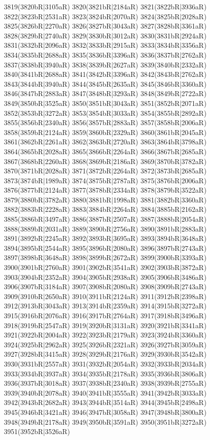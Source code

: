 3819(3820bR|3105aR) 3820(3821bR|2184aR) 3821(3822bR|3936aR) 3822(3823bR|2531aR) 3823(3824bR|2070aR) 3824(3825bR|2028aR) \\3825(3826bR|2270aR) 3826(3827bR|3043aR) 3827(3828bR|3361aR) 3828(3829bR|2740aR) 3829(3830bR|3012aR) 3830(3831bR|2924aR) 3831(3832bR|2096aR) 3832(3833bR|2915aR) 3833(3834bR|3356aR) \\3834(3835bR|2688aR) 3835(3836bR|3396aR) 3836(3837bR|2762aR) 3837(3838bR|3940aR) 3838(3839bR|2627aR) 3839(3840bR|2332aR) 3840(3841bR|2688aR) 3841(3842bR|3396aR) 3842(3843bR|2762aR) \\3843(3844bR|3940aR) 3844(3845bR|2635aR) 3845(3846bR|3360aR) 3846(3847bR|2883aR) 3847(3848bR|3293aR) 3848(3849bR|2722aR) 3849(3850bR|3525aR) 3850(3851bR|3043aR) 3851(3852bR|2071aR) \\3852(3853bR|3272aR) 3853(3854bR|3033aR) 3854(3855bR|2892aR) 3855(3856bR|2340aR) 3856(3857bR|2883aR) 3857(3858bR|2006aR) 3858(3859bR|2124aR) 3859(3860bR|2329aR) 3860(3861bR|2045aR) \\3861(3862bR|2261aR) 3862(3863bR|2720aR) 3863(3864bR|3798aR) 3864(3865bR|2028aR) 3865(3866bR|2264aR) 3866(3867bR|2685aR) 3867(3868bR|2260aR) 3868(3869bR|2186aR) 3869(3870bR|3782aR) \\3870(3871bR|2028aR) 3871(3872bR|2264aR) 3872(3873bR|2685aR) 3873(3874bR|1989aR) 3874(3875bR|2787aR) 3875(3876bR|2006aR) 3876(3877bR|2124aR) 3877(3878bR|2334aR) 3878(3879bR|3522aR) \\3879(3880bR|3782aR) 3880(3881bR|1998aR) 3881(3882bR|3360aR) 3882(3883bR|2228aR) 3883(3884bR|2264aR) 3884(3885bR|2162aR) 3885(3886bR|3497aR) 3886(3887bR|2507aR) 3887(3888bR|2054aR) \\3888(3889bR|2031aR) 3889(3890bR|2756aR) 3890(3891bR|2883aR) 3891(3892bR|2245aR) 3892(3893bR|3695aR) 3893(3894bR|3648aR) 3894(3895bR|2544aR) 3895(3896bR|2080aR) 3896(3897bR|2743aR) \\3897(3898bR|3648aR) 3898(3899bR|2672aR) 3899(3900bR|3393aR) 3900(3901bR|2760aR) 3901(3902bR|3541aR) 3902(3903bR|3872aR) 3903(3904bR|2352aR) 3904(3905bR|2938aR) 3905(3906bR|3486aR) \\3906(3907bR|3184aR) 3907(3908bR|2080aR) 3908(3909bR|2743aR) 3909(3910bR|2650aR) 3910(3911bR|2124aR) 3911(3912bR|2398aR) 3912(3913bR|3043aR) 3913(3914bR|2359aR) 3914(3915bR|3272aR) \\3915(3916bR|2076aR) 3916(3917bR|2764aR) 3917(3918bR|3496aR) 3918(3919bR|2547aR) 3919(3920bR|3131aR) 3920(3921bR|3341aR) 3921(3922bR|2004aR) 3922(3923bR|2179aR) 3923(3924bR|3360aR) \\3924(3925bR|2962aR) 3925(3926bR|2321aR) 3926(3927bR|3059aR) 3927(3928bR|3415aR) 3928(3929bR|2176aR) 3929(3930bR|3542aR) 3930(3931bR|2557aR) 3931(3932bR|2054aR) 3932(3933bR|2034aR) \\3933(3934bR|3937aR) 3934(3935bR|2178aR) 3935(3936bR|3806aR) 3936(3937bR|3018aR) 3937(3938bR|2340aR) 3938(3939bR|2755aR) 3939(3940bR|2078aR) 3940(3941bR|3555aR) 3941(3942bR|3033aR) \\3942(3943bR|2682aR) 3943(3944bR|3514aR) 3944(3945bR|2498aR) 3945(3946bR|3421aR) 3946(3947bR|3058aR) 3947(3948bR|3800aR) 3948(3949bR|2178aR) 3949(3950bR|3591aR) 3950(3951bR|3272aR) \\3951(3952bR|3526aR) 